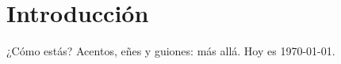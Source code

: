 \documentclass{article}
\begin{document}
\section{Introducción}
¿Cómo estás? Acentos, eñes y guiones: más allá. Hoy es \today.
\end{document}
